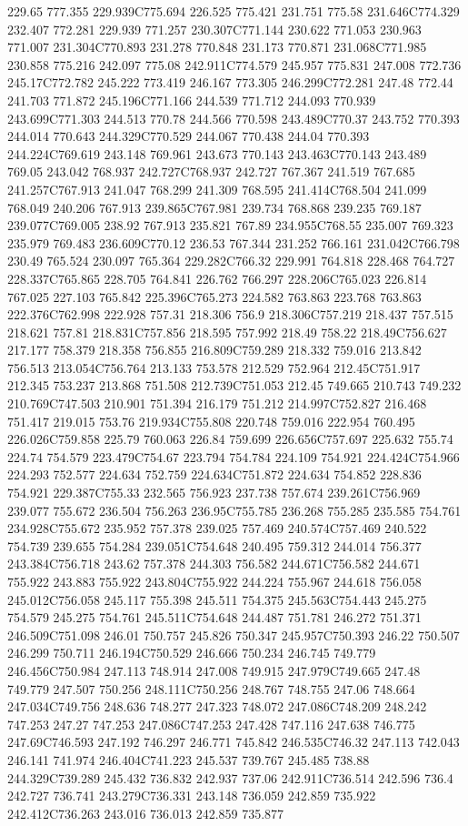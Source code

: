 229.65 777.355 229.939C775.694 226.525 775.421 231.751 775.58 231.646C774.329 232.407 772.281 229.939 771.257 230.307C771.144 230.622 771.053 230.963 771.007 231.304C770.893 231.278 770.848 231.173 770.871 231.068C771.985 230.858 775.216 242.097 775.08 242.911C774.579 245.957 775.831 247.008 772.736 245.17C772.782 245.222 773.419 246.167 773.305 246.299C772.281 247.48 772.44 241.703 771.872 245.196C771.166 244.539 771.712 244.093 770.939 243.699C771.303 244.513 770.78 244.566 770.598 243.489C770.37 243.752 770.393 244.014 770.643 244.329C770.529 244.067 770.438 244.04 770.393 244.224C769.619 243.148 769.961 243.673 770.143 243.463C770.143 243.489 769.05 243.042 768.937 242.727C768.937 242.727 767.367 241.519 767.685 241.257C767.913 241.047 768.299 241.309 768.595 241.414C768.504 241.099 768.049 240.206 767.913 239.865C767.981 239.734 768.868 239.235 769.187 239.077C769.005 238.92 767.913 235.821 767.89 234.955C768.55 235.007 769.323 235.979 769.483 236.609C770.12 236.53 767.344 231.252 766.161 231.042C766.798 230.49 765.524 230.097 765.364 229.282C766.32 229.991 764.818 228.468 764.727 228.337C765.865 228.705 764.841 226.762 766.297 228.206C765.023 226.814 767.025 227.103 765.842 225.396C765.273 224.582 763.863 223.768 763.863 222.376C762.998 222.928 757.31 218.306 756.9 218.306C757.219 218.437 757.515 218.621 757.81 218.831C757.856 218.595 757.992 218.49 758.22 218.49C756.627 217.177 758.379 218.358 756.855 216.809C759.289 218.332 759.016 213.842 756.513 213.054C756.764 213.133 753.578 212.529 752.964 212.45C751.917 212.345 753.237 213.868 751.508 212.739C751.053 212.45 749.665 210.743 749.232 210.769C747.503 210.901 751.394 216.179 751.212 214.997C752.827 216.468 751.417 219.015 753.76 219.934C755.808 220.748 759.016 222.954 760.495 226.026C759.858 225.79 760.063 226.84 759.699 226.656C757.697 225.632 755.74 224.74 754.579 223.479C754.67 223.794 754.784 224.109 754.921 224.424C754.966 224.293 752.577 224.634 752.759 224.634C751.872 224.634 754.852 228.836 754.921 229.387C755.33 232.565 756.923 237.738 757.674 239.261C756.969 239.077 755.672 236.504 756.263 236.95C755.785 236.268 755.285 235.585 754.761 234.928C755.672 235.952 757.378 239.025 757.469 240.574C757.469 240.522 754.739 239.655 754.284 239.051C754.648 240.495 759.312 244.014 756.377 243.384C756.718 243.62 757.378 244.303 756.582 244.671C756.582 244.671 755.922 243.883 755.922 243.804C755.922 244.224 755.967 244.618 756.058 245.012C756.058 245.117 755.398 245.511 754.375 245.563C754.443 245.275 754.579 245.275 754.761 245.511C754.648 244.487 751.781 246.272 751.371 246.509C751.098 246.01 750.757 245.826 750.347 245.957C750.393 246.22 750.507 246.299 750.711 246.194C750.529 246.666 750.234 246.745 749.779 246.456C750.984 247.113 748.914 247.008 749.915 247.979C749.665 247.48 749.779 247.507 750.256 248.111C750.256 248.767 748.755 247.06 748.664 247.034C749.756 248.636 748.277 247.323 748.072 247.086C748.209 248.242 747.253 247.27 747.253 247.086C747.253 247.428 747.116 247.638 746.775 247.69C746.593 247.192 746.297 246.771 745.842 246.535C746.32 247.113 742.043 246.141 741.974 246.404C741.223 245.537 739.767 245.485 738.88 244.329C739.289 245.432 736.832 242.937 737.06 242.911C736.514 242.596 736.4 242.727 736.741 243.279C736.331 243.148 736.059 242.859 735.922 242.412C736.263 243.016 736.013 242.859 735.877 